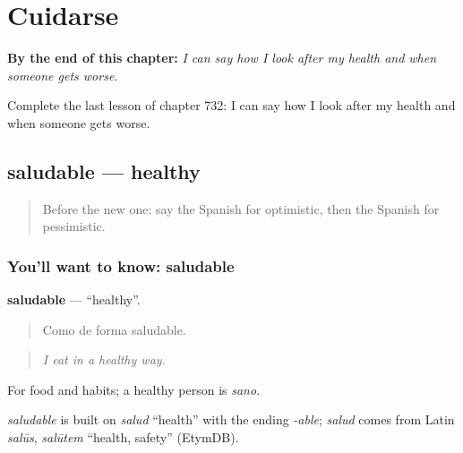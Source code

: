 
\chapter{Cuidarse}
\label{ch:es-cuidarse}

\begin{chapteropening}
\textbf{By the end of this chapter:} \emph{I can say how I look after my health and when someone gets worse.}

Complete the last lesson of chapter 732: I can say how I look after my health and when someone gets worse.
\end{chapteropening}

\section[saludable]{saludable — healthy}

\label{lesson:ES-C732-saludable}



\begin{quote}
Before the new one: say the Spanish for optimistic, then the Spanish for pessimistic.
\end{quote}

\subsection*{You'll want to know: saludable}
\textbf{saludable} — \textquotedblleft{}healthy\textquotedblright{}.

\begin{quote}
Como de forma saludable.
\end{quote}

\begin{quote}
\emph{I eat in a healthy way.}
\end{quote}

For food and habits; a healthy person is \emph{sano}.

\begin{cousinweb}
\emph{saludable} is built on \emph{salud} \textquotedblleft{}health\textquotedblright{} with the ending \emph{-able}; \emph{salud} comes from Latin \emph{salūs}, \emph{salūtem} \textquotedblleft{}health, safety\textquotedblright{} (EtymDB).
\end{cousinweb}

